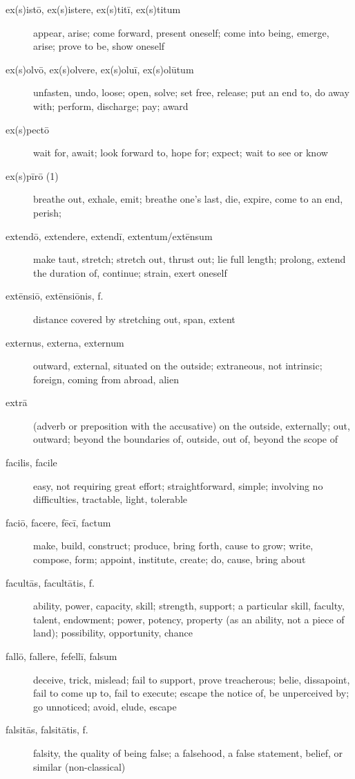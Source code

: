 \begin{description}
    \item[ex(s)istō, ex(s)istere, ex(s)titī, ex(s)titum] appear, arise; come forward, present oneself; come into being, emerge, arise; prove to be, show oneself
    \item[ex(s)olvō, ex(s)olvere, ex(s)oluī, ex(s)olūtum] unfasten, undo, loose; open, solve; set free, release; put an end to, do away with; perform, discharge; pay; award
    \item[ex(s)pectō] wait for, await; look forward to, hope for; expect; wait to see or know
    \item[ex(s)pīrō (1)] breathe out, exhale, emit; breathe one's last, die, expire, come to an end, perish;
    \item[extendō, extendere, extendī, extentum/extēnsum] make taut, stretch; stretch out, thrust out; lie full length; prolong, extend the duration of, continue; strain, exert oneself
    \item[extēnsiō, extēnsiōnis, f.] distance covered by stretching out, span, extent
    \item[externus, externa, externum] outward, external, situated on the outside; extraneous, not intrinsic; foreign, coming from abroad, alien
    \item[extrā] \marginnote{*}(adverb or preposition with the accusative) on the outside, externally; out, outward; beyond the boundaries of, outside, out of, beyond the scope of
    \item[facilis, facile] \marginnote{*}easy, not requiring great effort; straightforward, simple; involving no difficulties, tractable, light, tolerable
    \item[faciō, facere, fēcī, factum] \marginnote{*}make, build, construct; produce, bring forth, cause to grow; write, compose, form; appoint, institute, create; do, cause, bring about
    \item[facultās, facultātis, f.] ability, power, capacity, skill; strength, support; a particular skill, faculty, talent, endowment; power, potency, property (as an ability, not a piece of land); possibility, opportunity, chance
    \item[fallō, fallere, fefellī, falsum] \marginnote{*}deceive, trick, mislead; fail to support, prove treacherous; belie, dissapoint, fail to come up to, fail to execute; escape the notice of, be unperceived by; go unnoticed; avoid, elude, escape
    \item[falsitās, falsitātis, f.] falsity, the quality of being false; a falsehood, a false statement, belief, or similar (non-classical)

\end{description}
